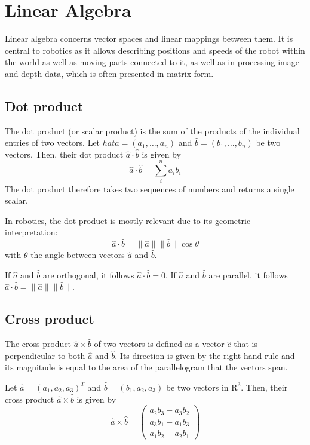 \chapter{Linear Algebra}\label{app:linalg}

Linear algebra concerns vector spaces and linear mappings between them. It is central to robotics as it allows describing positions and speeds of the robot within the world as well as moving parts connected to it, as well as in processing image and depth data, which is often presented in matrix form.

\section{Dot product}\label{app:linalg:dotproduct}

The dot product (or scalar product) is the sum of the products of the individual entries of two vectors. Let $hat{a}=(a_1,\ldots,a_n)$ and $\hat{b}=(b_1,\ldots,b_n)$ be two vectors. Then, their dot product $\hat{a}\cdot\hat{b}$ is given by
\begin{equation}
\hat{a}\cdot\hat{b}=\sum_{i}^n a_ib_i
\end{equation}
The dot product therefore takes two sequences of numbers and returns a single scalar.

In robotics, the dot product is mostly relevant due to its geometric interpretation:
\begin{equation}
\hat{a}\cdot\hat{b}=\|\hat{a}\|\|\hat{b}\|\cos\theta
\end{equation}
with $\theta$ the angle between vectors $\hat{a}$ and $\hat{b}$.

If $\hat{a}$ and $\hat{b}$ are orthogonal, it follows $\hat{a}\cdot\hat{b}=0$. If $\hat{a}$ and $\hat{b}$ are parallel, it follows $\hat{a}\cdot\hat{b}=\|\hat{a}\|\|\hat{b}\|$.

\section{Cross product}

The cross product $\hat{a} \times \hat{b}$ of two vectors is defined as a vector $\hat{c}$ that is perpendicular to both $\hat{a}$ and $\hat{b}$. Its direction is given by the right-hand rule and its magnitude is equal to the area of the parallelogram that the vectors span.

Let $\hat{a}=(a_1,a_2,a_3)^T$ and $\hat{b}=(b_1,a_2,a_3)$ be two vectors in $\mathrm{R}^3$. Then, their cross product $\hat{a}\times\hat{b}$ is given by
\begin{equation}
\hat{a}\times\hat{b}=\left(
\begin{array}{l}
a_2b_3-a_3b_2\\
a_3b_1-a_1b_3\\
a_1b_2-a_2b_1
\end{array}
\right)
\end{equation}


